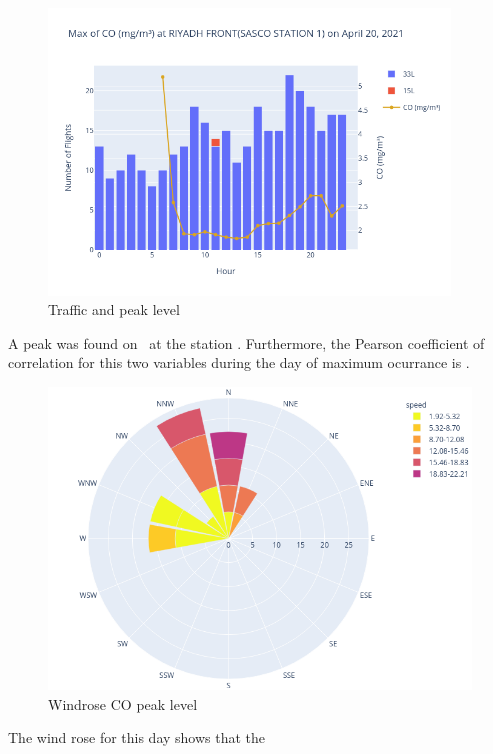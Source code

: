 \documentclass[12pt, oneside]{book}
\begin{document}
{\begin{figure}[H]
\centering
\includegraphics[width=0.95\textwidth, keepaspectratio]{image10}
\caption{Traffic and  peak level}\label{image10}
\end{figure}}{}

A  peak was found on \dayMaxCO \ at the station \stationMaxCO . %
Furthermore, the Pearson coefficient of correlation for this two variables during the day of maximum ocurrance is \correlCO .  

{\begin{figure}[H]
\centering
\includegraphics[width=.8\textwidth, keepaspectratio]{windroseCO}
\caption{Windrose CO peak level}\label{windroseCO}
\end{figure}}{}

The wind rose for this day shows that the \windCO

\section{}
\end{document}
